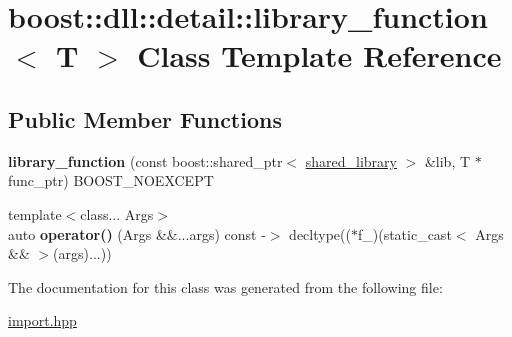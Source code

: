 \hypertarget{a00191}{}\section{boost\+:\+:dll\+:\+:detail\+:\+:library\+\_\+function$<$ T $>$ Class Template Reference}
\label{a00191}
\subsection*{Public Member Functions}
\begin{DoxyCompactItemize}
\item 
{\bfseries library\+\_\+function} (const boost\+::shared\+\_\+ptr$<$ \hyperlink{a00271}{shared\+\_\+library} $>$ \&lib, T $\ast$func\+\_\+ptr) B\+O\+O\+S\+T\+\_\+\+N\+O\+E\+X\+C\+E\+PT\hypertarget{a00191_ad09ab3a2ca8c6c1bd8591edaa08d7d30}{}\label{a00191_ad09ab3a2ca8c6c1bd8591edaa08d7d30}

\item 
{\footnotesize template$<$class... Args$>$ }\\auto {\bfseries operator()} (Args \&\&...args) const  -\/$>$ decltype(($\ast$f\+\_\+)(static\+\_\+cast$<$ Args \&\& $>$(args)...))                        \hypertarget{a00191_a7bb862a3841f33eb59488671e6b0bb42}{}\label{a00191_a7bb862a3841f33eb59488671e6b0bb42}

\end{DoxyCompactItemize}


The documentation for this class was generated from the following file\+:\begin{DoxyCompactItemize}
\item 
\hyperlink{a00570}{import.\+hpp}\end{DoxyCompactItemize}
